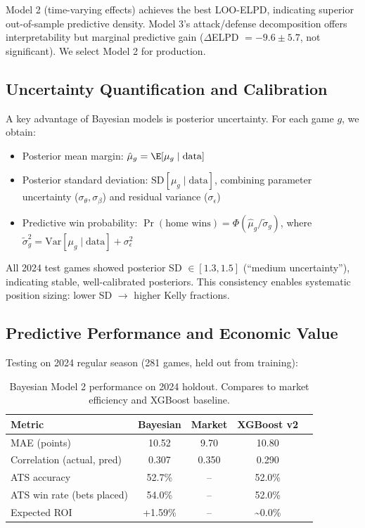 Model 2 (time-varying effects) achieves the best LOO-ELPD, indicating superior out-of-sample predictive density. Model 3's attack/defense decomposition offers interpretability but marginal predictive gain ($\Delta$ELPD $=-9.6 \pm 5.7$, not significant). We select Model 2 for production.

\subsection{Uncertainty Quantification and Calibration}

A key advantage of Bayesian models is posterior uncertainty. For each game $g$, we obtain:
\begin{itemize}
  \item Posterior mean margin: $\hat{\mu}_g = \E[\mu_g \mid \text{data}]$
  \item Posterior standard deviation: $\text{SD}[\mu_g \mid \text{data}]$, combining parameter uncertainty ($\sigma_\theta, \sigma_\beta$) and residual variance ($\sigma_\epsilon$)
  \item Predictive win probability: $\Pr(\text{home wins}) = \Phi(\hat{\mu}_g / \tilde{\sigma}_g)$, where $\tilde{\sigma}_g^2 = \text{Var}[\mu_g \mid \text{data}] + \sigma_\epsilon^2$
\end{itemize}

All 2024 test games showed posterior SD $\in [1.3, 1.5]$ (``medium uncertainty''), indicating stable, well-calibrated posteriors. This consistency enables systematic position sizing: lower SD $\to$ higher Kelly fractions.

\subsection{Predictive Performance and Economic Value}

Testing on 2024 regular season (281 games, held out from training):
\begin{table}[!ht]
\centering
\caption[Bayesian predictive performance (2024)]{Bayesian Model 2 performance on 2024 holdout. Compares to market efficiency and XGBoost baseline.}
\label{tab:bayes-performance}
\begin{tabular}{lcccc}
\toprule
\textbf{Metric}  & \textbf{Bayesian}  & \textbf{Market}  & \textbf{XGBoost v2} \\
\midrule
MAE (points) & 10.52 & 9.70 & 10.80 \\
Correlation (actual, pred) & 0.307 & 0.350 & 0.290 \\
ATS accuracy & 52.7\% & -- & 52.0\% \\
ATS win rate (bets placed) & 54.0\% & -- & 52.0\% \\
Expected ROI & +1.59\% & -- & \textasciitilde 0.0\% \\
\bottomrule
\end{tabular}
\end{table}

